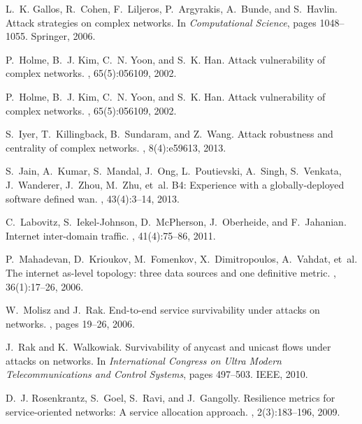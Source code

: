 \documentclass{sig-alternate-10pt}
\begin{document}
\begin{thebibliography}{10}
L.~K. Gallos, R.~Cohen, F.~Liljeros, P.~Argyrakis, A.~Bunde, and S.~Havlin.
\newblock Attack strategies on complex networks.
\newblock In {\em Computational Science}, pages 1048--1055. Springer, 2006.

P.~Holme, B.~J. Kim, C.~N. Yoon, and S.~K. Han.
\newblock Attack vulnerability of complex networks.
, 65(5):056109, 2002.

P.~Holme, B.~J. Kim, C.~N. Yoon, and S.~K. Han.
\newblock Attack vulnerability of complex networks.
, 65(5):056109, 2002.

S.~Iyer, T.~Killingback, B.~Sundaram, and Z.~Wang.
\newblock Attack robustness and centrality of complex networks.
, 8(4):e59613, 2013.

S.~Jain, A.~Kumar, S.~Mandal, J.~Ong, L.~Poutievski, A.~Singh, S.~Venkata,
  J.~Wanderer, J.~Zhou, M.~Zhu, et~al.
\newblock B4: Experience with a globally-deployed software defined wan.
, 43(4):3--14, 2013.

C.~Labovitz, S.~Iekel-Johnson, D.~McPherson, J.~Oberheide, and F.~Jahanian.
\newblock Internet inter-domain traffic.
, 41(4):75--86, 2011.

P.~Mahadevan, D.~Krioukov, M.~Fomenkov, X.~Dimitropoulos, A.~Vahdat, et~al.
\newblock The internet as-level topology: three data sources and one definitive
  metric.
, 36(1):17--26, 2006.

W.~Molisz and J.~Rak.
\newblock End-to-end service survivability under attacks on networks.
, pages
  19--26, 2006.

J.~Rak and K.~Walkowiak.
\newblock Survivability of anycast and unicast flows under attacks on networks.
\newblock In {\em International Congress on Ultra Modern Telecommunications and
  Control Systems}, pages 497--503. IEEE, 2010.

D.~J. Rosenkrantz, S.~Goel, S.~Ravi, and J.~Gangolly.
\newblock Resilience metrics for service-oriented networks: A service
  allocation approach.
, 2(3):183--196, 2009.


\end{thebibliography}
\end{document}
